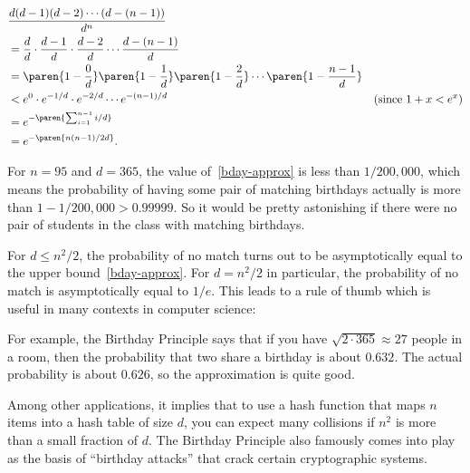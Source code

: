 \begin{align}
\lefteqn{\frac{d (d - 1) (d - 2) \cdots (d - (n - 1))}{d^n}}\notag\\
   & = \frac{d}{d} \cdot \frac{d-1}{d} \cdot \frac{d-2}{d} \cdots \frac{d - (n - 1)}{d}\\
   & = \paren{1 - \frac{0}{d}}
             \paren{1 - \frac{1}{d}}
             \paren{1 - \frac{2}{d}}
             \cdots
             \paren{1 - \frac{n - 1}{d}}\notag\\
   & < e^0 \cdot e^{-1/d} \cdot e^{-2/d} \cdots e^{-(n-1)/d} 
             & \text{(since $1+x < e^x$)}\notag\\
   & = e^{-\paren{\sum_{i=1}^{n-1} i/d}}\notag\\
   & = e^{-\paren{n(n-1)/2d}}\label{bday-approx}.
\end{align}

For $n=95$ and $d = 365$, the value of~\eqref{bday-approx} is less
than $1/200,000$, which means the probability of having some pair of
matching birthdays actually is more than $1 - 1/200,000 > 0.99999$.  So
it would be pretty astonishing if there were no pair of students in
the class with matching birthdays.

For $d \leq n^2/2$, the probability of no match turns out to be
asymptotically equal to the upper bound~\eqref{bday-approx}.  For $d =
n^2/2$ in particular, the probability of no match is asymptotically
equal to $1/e$.  This leads to a rule of thumb which is useful in many
contexts in computer science:


For example, the Birthday Principle says that if you have $\sqrt{2
  \cdot 365} \approx 27$ people in a room, then the probability that
two share a birthday is about $0.632$.  The actual probability is
about $0.626$, so the approximation is quite good.

Among other applications, it implies that to use a hash function that
maps $n$ items into a hash table of size $d$, you can expect many
collisions if $n^2$ is more than a small fraction of $d$.  The
Birthday Principle also famously comes into play as the basis of
``birthday attacks'' that crack certain cryptographic systems.


\iffalse %

